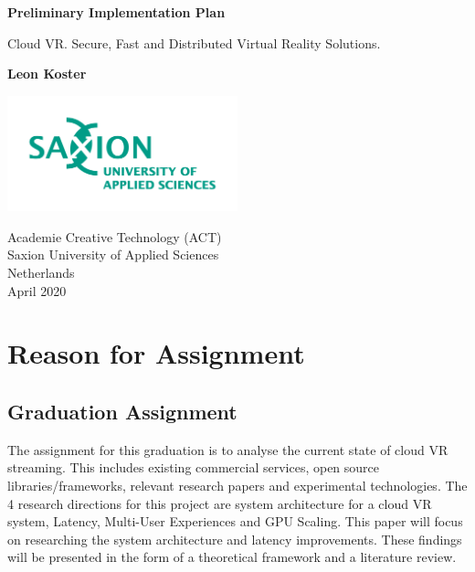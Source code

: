 \documentclass[]{article}
\begin{document}
\begin{titlepage}
   \begin{center}
       \vspace*{1cm}

       \textbf{Preliminary Implementation Plan}

       \vspace{0.5cm}
       Cloud VR. Secure, Fast and Distributed Virtual Reality Solutions.
       \vspace{1.5cm}

       \textbf{Leon Koster}

       \vfill
            
       \vspace{0.8cm}
     
      \includegraphics[width=0.5\textwidth]{university}
            
       Academie Creative Technology (ACT)\\
       Saxion University of Applied Sciences\\
       Netherlands\\
       April 2020
            
   \end{center}
\end{titlepage}


\section{Reason for Assignment}
\subsection{Graduation Assignment}
The assignment for this graduation is to analyse the current state of cloud VR streaming. This includes existing commercial services, open source libraries/frameworks, relevant research papers and experimental technologies. The 4 research directions for this project are system architecture for a cloud VR system, Latency, Multi-User Experiences and GPU Scaling. This paper will focus on researching the system architecture and latency improvements. These findings will be presented in the form of a theoretical framework and a literature review.
\end{document}
